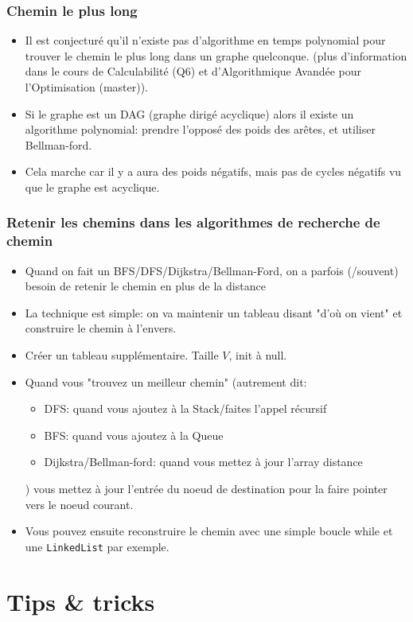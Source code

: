 \documentclass[8pt,aspectratio=169]{beamer}
\begin{document}
\begin{frame}[fragile]
\frametitle{Chemin le plus long}
\begin{itemize}
	\item Il est conjecturé qu'il n'existe pas d'algorithme en temps polynomial pour trouver le chemin le plus long dans un graphe quelconque. (plus d'information dans le cours de Calculabilité (Q6) et d'Algorithmique Avandée pour l'Optimisation (master)).
	\item Si le graphe est un DAG (graphe dirigé acyclique) alors il existe un algorithme polynomial: prendre l'opposé des poids des arêtes, et utiliser Bellman-ford.
	\item Cela marche car il y a aura des poids négatifs, mais pas de cycles négatifs vu que le graphe est acyclique.
\end{itemize}
\end{frame}

\begin{frame}
\frametitle{Retenir les chemins dans les algorithmes de recherche de chemin}
\begin{itemize}
	\item Quand on fait un BFS/DFS/Dijkstra/Bellman-Ford, on a parfois (/souvent) besoin de retenir le chemin en plus de la distance
	\item La technique est simple: on va maintenir un tableau disant "d'où on vient" et construire le chemin à l'envers.
	\item Créer un tableau supplémentaire. Taille $V$, init à null.
	\item Quand vous "trouvez un meilleur chemin" (autrement dit:
	\begin{itemize}
		\item DFS: quand vous ajoutez à la Stack/faites l'appel récursif
		\item BFS: quand vous ajoutez à la Queue
		\item Dijkstra/Bellman-ford: quand vous mettez à jour l'array distance
	\end{itemize}
	)
	vous mettez à jour l'entrée du noeud de destination pour la faire pointer vers le noeud courant.
	\item Vous pouvez ensuite reconstruire le chemin avec une simple boucle while et une \texttt{LinkedList} par exemple.
\end{itemize}
\end{frame}

\section{Tips \& tricks}
\end{document}
